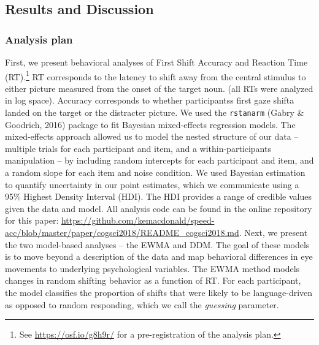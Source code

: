 \documentclass[10pt, letterpaper]{article}
\begin{document}
\subsection{Results and Discussion}\label{results-and-discussion}

\subsubsection{Analysis plan}\label{analysis-plan}

First, we present behavioral analyses of First Shift Accuracy and
Reaction Time (RT).\footnote{See \url{https://osf.io/g8h9r/} for a
  pre-registration of the analysis plan.} RT corresponds to the latency
to shift away from the central stimulus to either picture measured from
the onset of the target noun. (all RTs were analyzed in log space).
Accuracy corresponds to whether participantss first gaze shifta landed
on the target or the distracter picture. We used the \texttt{rstanarm}
(Gabry \& Goodrich, 2016) package to fit Bayesian mixed-effects
regression models. The mixed-effects approach allowed us to model the
nested structure of our data -- multiple trials for each participant and
item, and a within-participants manipulation -- by including random
intercepts for each participant and item, and a random slope for each
item and noise condition. We used Bayesian estimation to quantify
uncertainty in our point estimates, which we communicate using a 95\%
Highest Density Interval (HDI). The HDI provides a range of credible
values given the data and model. All analysis code can be found in the
online repository for this paper:
\url{https://github.com/kemacdonald/speed-acc/blob/master/paper/cogsci2018/README_cogsci2018.md}.
Next, we present the two model-based analyses -- the EWMA and DDM. The
goal of these models is to move beyond a description of the data and map
behavioral differences in eye movements to underlying psychological
variables. The EWMA method models changes in random shifting behavior as
a function of RT. For each participant, the model classifies the
proportion of shifts that were likely to be language-driven as opposed
to random responding, which we call the \emph{guessing} parameter.
\end{document}
